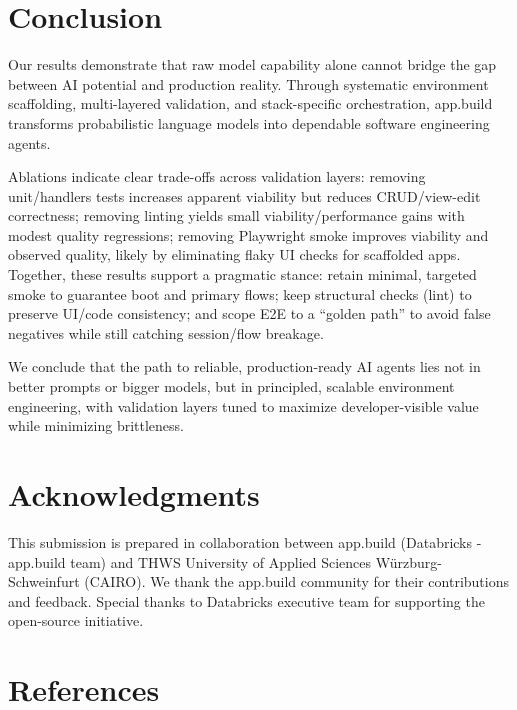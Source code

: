 \documentclass{article}
\begin{document}
\section{Conclusion}

Our results demonstrate that raw model capability alone cannot bridge the gap between AI potential and production reality. Through systematic environment scaffolding, multi-layered validation, and stack-specific orchestration, app.build transforms probabilistic language models into dependable software engineering agents.

Ablations indicate clear trade-offs across validation layers: removing unit/handlers tests increases apparent viability but reduces CRUD/view-edit correctness; removing linting yields small viability/performance gains with modest quality regressions; removing Playwright smoke improves viability and observed quality, likely by eliminating flaky UI checks for scaffolded apps. Together, these results support a pragmatic stance: retain minimal, targeted smoke to guarantee boot and primary flows; keep structural checks (lint) to preserve UI/code consistency; and scope E2E to a ``golden path'' to avoid false negatives while still catching session/flow breakage.

We conclude that the path to reliable, production-ready AI agents lies not in better prompts or bigger models, but in principled, scalable environment engineering, with validation layers tuned to maximize developer-visible value while minimizing brittleness.

\section*{Acknowledgments}

This submission is prepared in collaboration between app.build (Databricks - app.build team) and THWS University of Applied Sciences W\"urzburg-Schweinfurt (CAIRO). We thank the app.build community for their contributions and feedback. Special thanks to Databricks executive team for supporting the open-source initiative.

\section*{References}


\small
\end{document}
